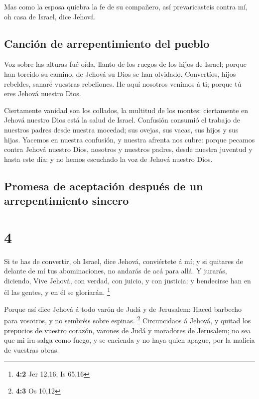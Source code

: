  Mas como la esposa quiebra la fe de su compañero, así
prevaricasteis contra mí, oh casa de Israel, dice Jehová.

\hypertarget{canciuxf3n-de-arrepentimiento-del-pueblo}{%
\subsection{Canción de arrepentimiento del
pueblo}\label{canciuxf3n-de-arrepentimiento-del-pueblo}}

 Voz sobre las alturas fué oída, llanto de los ruegos de
los hijos de Israel; porque han torcido su camino, de Jehová su Dios se
han olvidado.  Convertíos, hijos rebeldes, sanaré vuestras
rebeliones. He aquí nosotros venimos á ti; porque tú eres Jehová nuestro
Dios.

 Ciertamente vanidad son los collados, la multitud de los
montes: ciertamente en Jehová nuestro Dios está la salud de Israel.
 Confusión consumió el trabajo de nuestros padres desde
nuestra mocedad; sus ovejas, sus vacas, sus hijos y sus hijas.
 Yacemos en nuestra confusión, y nuestra afrenta nos cubre:
porque pecamos contra Jehová nuestro Dios, nosotros y nuestros padres,
desde nuestra juventud y hasta este día; y no hemos escuchado la voz de
Jehová nuestro Dios.

\hypertarget{promesa-de-aceptaciuxf3n-despuuxe9s-de-un-arrepentimiento-sincero}{%
\subsection{Promesa de aceptación después de un arrepentimiento
sincero}\label{promesa-de-aceptaciuxf3n-despuuxe9s-de-un-arrepentimiento-sincero}}

\hypertarget{section-3}{%
\section{4}\label{section-3}}

 Si te has de convertir, oh Israel, dice Jehová, conviértete
á mí; y si quitares de delante de mí tus abominaciones, no andarás de
acá para allá.  Y jurarás, diciendo, Vive Jehová, con
verdad, con juicio, y con justicia: y bendecirse han en él las gentes, y
en él se gloriarán. \footnote{\textbf{4:2} Jer 12,16; Is 65,16}

 Porque así dice Jehová á todo varón de Judá y de Jerusalem:
Haced barbecho para vosotros, y no sembréis sobre espinas. \footnote{\textbf{4:3}
  Os 10,12}  Circuncidaos á Jehová, y quitad los prepucios
de vuestro corazón, varones de Judá y moradores de Jerusalem; no sea que
mi ira salga como fuego, y se encienda y no haya quien apague, por la
malicia de vuestras obras.

